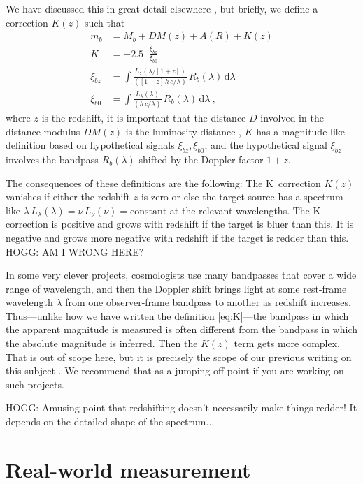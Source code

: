 \documentclass[10pt]{article}
\newcommand{\dd}{\mathrm{d}}
\DeclareMathOperator{\logten}{log_{10}}
\begin{document}
We have discussed this in great detail elsewhere \cite{kcorrect}, but briefly, we define a correction $K(z)$ such that
\begin{align}
    m_b &= M_b + DM(z) + A(R) + K(z)\label{eq:K}\\
    K &= -2.5\logten\frac{\xi_{bz}}{\xi_{b0}}\\
    \xi_{bz} &= \int\frac{L_\lambda(\lambda/[1+z])}{([1+z]\,h\,c/\lambda)}\,R_b(\lambda)\,\dd\lambda\\
    \xi_{b0} &= \int\frac{L_\lambda(\lambda)}{(h\,c/\lambda)}\,R_b(\lambda)\,\dd\lambda ~,
\end{align}
where $z$ is the redshift,
it is important that the distance $D$ involved in the distance modulus $DM(z)$ is the luminosity distance \cite{distances},
$K$ has a magnitude-like definition based on hypothetical signals $\xi_{bz}, \xi_{b0}$,
and the hypothetical signal $\xi_{bz}$ involves the bandpass $R_b(\lambda)$ shifted by the Doppler factor $1+z$.

The consequences of these definitions are the following:
The K~correction $K(z)$ vanishes if either the redshift $z$ is zero or else the target source has a spectrum like $\lambda\,L_\lambda(\lambda)=\nu\,L_\nu(\nu)=\text{constant}$ at the relevant wavelengths.
The K-correction is positive and grows with redshift if the target is bluer than this.
It is negative and grows more negative with redshift if the target is redder than this.
HOGG: AM I WRONG HERE?

In some very clever projects, cosmologists use many bandpasses that cover a wide range of wavelength, and then the Doppler shift brings light at some rest-frame wavelength $\lambda$ from one observer-frame bandpass to another as redshift increases.
Thus---unlike how we have written the definition \eqref{eq:K}---the bandpass in which the apparent magnitude is measured is often different from the bandpass in which the absolute magnitude is inferred. Then the $K(z)$ term gets more complex.
That is out of scope here, but it is precisely the scope of our previous writing on this subject \cite{kcorrect}.
We recommend that as a jumping-off point if you are working on such projects.

HOGG: Amusing point that redshifting doesn't necessarily make things redder! It depends on the detailed shape of the spectrum...

\section{Real-world measurement}\label{sec:practice}
\end{document}

